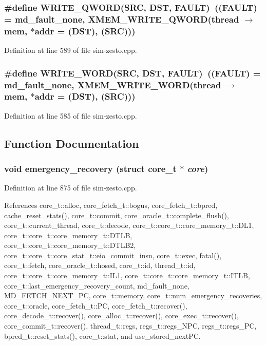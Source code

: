 \subsubsection[{WRITE\_\-QWORD}]{\setlength{\rightskip}{0pt plus 5cm}\#define WRITE\_\-QWORD(SRC, \/  DST, \/  FAULT)~((FAULT) = md\_\-fault\_\-none, XMEM\_\-WRITE\_\-QWORD(thread $\rightarrow$ mem, $\ast$addr = (DST), (SRC)))}\label{sim-zesto_8cpp_973ac8efc8287f3aebe50e8cf1aef741}




Definition at line 589 of file sim-zesto.cpp.
\subsubsection[{WRITE\_\-WORD}]{\setlength{\rightskip}{0pt plus 5cm}\#define WRITE\_\-WORD(SRC, \/  DST, \/  FAULT)~((FAULT) = md\_\-fault\_\-none, XMEM\_\-WRITE\_\-WORD(thread $\rightarrow$ mem, $\ast$addr = (DST), (SRC)))}\label{sim-zesto_8cpp_39396193613c8f3b1a09a4ff205c16da}




Definition at line 585 of file sim-zesto.cpp.

\subsection{Function Documentation}
\subsubsection[{emergency\_\-recovery}]{\setlength{\rightskip}{0pt plus 5cm}void emergency\_\-recovery (struct {\bf core\_\-t} $\ast$ {\em core})}\label{sim-zesto_8cpp_46f3df2fecce36d299cd1dd4534d0088}




Definition at line 875 of file sim-zesto.cpp.

References core\_\-t::alloc, core\_\-fetch\_\-t::bogus, core\_\-fetch\_\-t::bpred, cache\_\-reset\_\-stats(), core\_\-t::commit, core\_\-oracle\_\-t::complete\_\-flush(), core\_\-t::current\_\-thread, core\_\-t::decode, core\_\-t::core\_\-t::core\_\-memory\_\-t::DL1, core\_\-t::core\_\-t::core\_\-memory\_\-t::DTLB, core\_\-t::core\_\-t::core\_\-memory\_\-t::DTLB2, core\_\-t::core\_\-t::core\_\-stat\_\-t::eio\_\-commit\_\-insn, core\_\-t::exec, fatal(), core\_\-t::fetch, core\_\-oracle\_\-t::hosed, core\_\-t::id, thread\_\-t::id, core\_\-t::core\_\-t::core\_\-memory\_\-t::IL1, core\_\-t::core\_\-t::core\_\-memory\_\-t::ITLB, core\_\-t::last\_\-emergency\_\-recovery\_\-count, md\_\-fault\_\-none, MD\_\-FETCH\_\-NEXT\_\-PC, core\_\-t::memory, core\_\-t::num\_\-emergency\_\-recoveries, core\_\-t::oracle, core\_\-fetch\_\-t::PC, core\_\-fetch\_\-t::recover(), core\_\-decode\_\-t::recover(), core\_\-alloc\_\-t::recover(), core\_\-exec\_\-t::recover(), core\_\-commit\_\-t::recover(), thread\_\-t::regs, regs\_\-t::regs\_\-NPC, regs\_\-t::regs\_\-PC, bpred\_\-t::reset\_\-stats(), core\_\-t::stat, and use\_\-stored\_\-nextPC.

